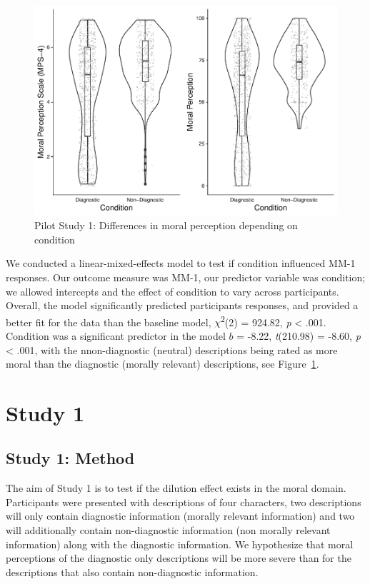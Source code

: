 \documentclass[
  american,
  man,floatsintext]{apa7}
\begin{document}
\begin{figure}
\centering
\includegraphics{moral_dilution_in_chunks_files/figure-latex/pilot1bothconditionplot-1.pdf}
\caption{\label{fig:pilot1bothconditionplot}Pilot Study 1: Differences in moral perception depending on condition}
\end{figure}

We conducted a linear-mixed-effects model to test if condition influenced MM-1 responses. Our outcome measure was MM-1, our predictor variable was condition; we allowed intercepts and the effect of condition to vary across participants. Overall, the model significantly predicted participants responses, and provided a better fit for the data than the baseline model, \(\chi\)\textsuperscript{2}(2) = 924.82, \emph{p} \textless{} .001. Condition was a significant predictor in the model \(b\) = -8.22, \emph{t}(210.98) = -8.60, \emph{p} \textless{} .001, with the nnon-diagnostic (neutral) descriptions being rated as more moral than the diagnostic (morally relevant) descriptions, see Figure~\ref{fig:pilot1bothconditionplot}.

\hypertarget{study-1}{%
\section{Study 1}\label{study-1}}

\hypertarget{study-1-method}{%
\subsection{Study 1: Method}\label{study-1-method}}

The aim of Study 1 is to test if the dilution effect exists in the moral domain. Participants were presented with descriptions of four characters, two descriptions will only contain diagnostic information (morally relevant information) and two will additionally contain non-diagnostic information (non morally relevant information) along with the diagnostic information. We hypothesize that moral perceptions of the diagnostic only descriptions will be more severe than for the descriptions that also contain non-diagnostic information.
\end{document}

